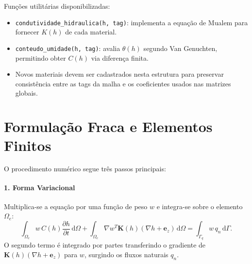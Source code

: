 \documentclass[a4paper,12pt]{article}
\begin{document}
Funções utilitárias disponibilizadas:
\begin{itemize}
    \item \texttt{condutividade\_hidraulica(h, tag)}: implementa a equação de Mualem para fornecer $K(h)$ de cada material.
    \item \texttt{conteudo\_umidade(h, tag)}: avalia $\theta(h)$ segundo Van Genuchten, permitindo obter $C(h)$ via diferença finita.
    \item Novos materiais devem ser cadastrados nesta estrutura para preservar consistência entre as tags da malha e os coeficientes usados nas matrizes globais.
\end{itemize}

\section{Formulação Fraca e Elementos Finitos}
O procedimento numérico segue três passos principais:

\paragraph{1. Forma Variacional} Multiplica-se a equação por uma função de peso $w$ e integra-se sobre o elemento $\Omega_e$:
\begin{equation}
    \int_{\Omega_e} w\,C(h)\frac{\partial h}{\partial t}\,\mathrm{d}\Omega + \int_{\Omega_e} \nabla w^T \mathbf{K}(h) (\nabla h + \mathbf{e}_z)\,\mathrm{d}\Omega = \int_{\Gamma_q} w\,q_n\,\mathrm{d}\Gamma.
\end{equation}
O segundo termo é integrado por partes transferindo o gradiente de $\mathbf{K}(h)(\nabla h + \mathbf{e}_z)$ para $w$, surgindo os fluxos naturais $q_n$.
\end{document}
